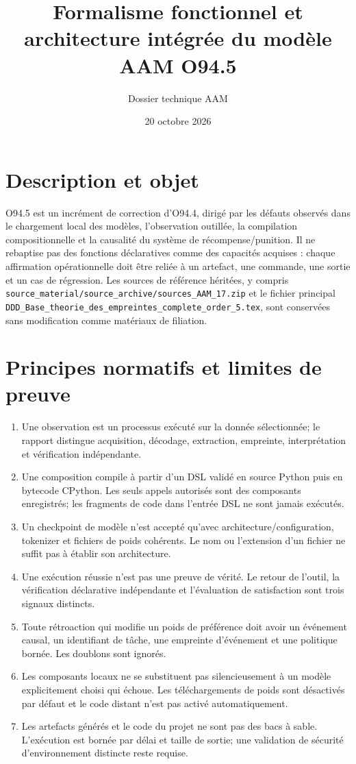 \documentclass[11pt,a4paper]{article}
\title{Formalisme fonctionnel et architecture intégrée du modèle AAM O94.5}
\author{Dossier technique AAM}
\date{20 octobre 2026}
\begin{document}
\maketitle
\tableofcontents
\section{Description et objet}
O94.5 est un incrément de correction d'O94.4, dirigé par les défauts observés dans le chargement local des modèles, l'observation outillée, la compilation compositionnelle et la causalité du système de récompense/punition. Il ne rebaptise pas des fonctions déclaratives comme des capacités acquises : chaque affirmation opérationnelle doit être reliée à un artefact, une commande, une sortie et un cas de régression. Les sources de référence héritées, y compris \texttt{source\_material/source\_archive/sources\_AAM\_17.zip} et le fichier principal \texttt{DDD\_Base\_theorie\_des\_empreintes\_complete\_order\_5.tex}, sont conservées sans modification comme matériaux de filiation.

\section{Principes normatifs et limites de preuve}
\begin{enumerate}[label=R\arabic*.]
\item Une observation est un processus exécuté sur la donnée sélectionnée; le rapport distingue acquisition, décodage, extraction, empreinte, interprétation et vérification indépendante.
\item Une composition compile à partir d'un DSL validé en source Python puis en bytecode CPython. Les seuls appels autorisés sont des composants enregistrés; les fragments de code dans l'entrée DSL ne sont jamais exécutés.
\item Un checkpoint de modèle n'est accepté qu'avec architecture/configuration, tokenizer et fichiers de poids cohérents. Le nom ou l'extension d'un fichier ne suffit pas à établir son architecture.
\item Une exécution réussie n'est pas une preuve de vérité. Le retour de l'outil, la vérification déclarative indépendante et l'évaluation de satisfaction sont trois signaux distincts.
\item Toute rétroaction qui modifie un poids de préférence doit avoir un événement causal, un identifiant de tâche, une empreinte d'événement et une politique bornée. Les doublons sont ignorés.
\item Les composants locaux ne se substituent pas silencieusement à un modèle explicitement choisi qui échoue. Les téléchargements de poids sont désactivés par défaut et le code distant n'est pas activé automatiquement.
\item Les artefacts générés et le code du projet ne sont pas des bacs à sable. L'exécution est bornée par délai et taille de sortie; une validation de sécurité d'environnement distincte reste requise.
\end{enumerate}
\end{document}
